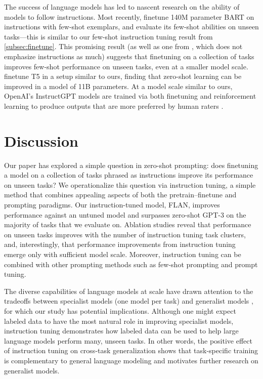\documentclass{article} \usepackage{iclr2022_conference,times}
\newcommand{\flan}{FLAN}
\begin{document}
The success of language models has led to nascent research on the ability of models to follow instructions. 
Most recently, \citet{mishra2021natural} finetune 140M parameter BART on instructions with few-shot exemplars, and evaluate its few-shot abilities on unseen tasks---this is similar to our few-shot instruction tuning result from \cref{subsec:finetune}.
This promising result (as well as one from \citet{ye2021crossfit}, which does not emphasize instructions as much) suggests that finetuning on a collection of tasks improves few-shot performance on unseen tasks, even at a smaller model scale.
\citet{sanh2021multitask} finetune T5 in a setup similar to ours, finding that zero-shot learning can be improved in a model of 11B parameters.
At a model scale similar to ours, OpenAI's InstructGPT models are trained via both finetuning and reinforcement learning to produce outputs that are more preferred by human raters \citep{ouyang2022instructgpt}.

\section{Discussion}

Our paper has explored a simple question in zero-shot prompting: does finetuning a model on a collection of tasks phrased as instructions improve its performance on unseen tasks?
We operationalize this question via instruction tuning, a simple method that combines appealing aspects of both the pretrain--finetune and prompting paradigms.
Our instruction-tuned model, \flan{}, improves performance against an untuned model and surpasses zero-shot GPT-3 on the majority of tasks that we evaluate on.
Ablation studies reveal that performance on unseen tasks improves with the number of instruction tuning task clusters, and, interestingly, that performance improvements from instruction tuning emerge only with sufficient model scale.
Moreover, instruction tuning can be combined with other prompting methods such as few-shot prompting and prompt tuning.

The diverse capabilities of language models at scale have drawn attention to the tradeoffs between specialist models (one model per task) and generalist models \citep[one model for many tasks;][]{arivazhagan2019massively,pratap2020massively}, for which our study has potential implications. 
Although one might expect labeled data to have the most natural role in improving specialist models, instruction tuning demonstrates how labeled data can be used to help large language models perform many, unseen tasks. 
In other words, the positive effect of instruction tuning on cross-task generalization shows that task-specific training is complementary to general language modeling and motivates further research on generalist models. 
\end{document}

